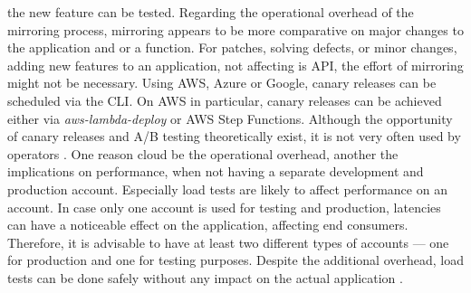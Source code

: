 \documentclass[a4paper,twoside,11pt, pagesize]{scrartcl}
\begin{document}
\begin{spacing}{1.2}
the new feature can be tested. Regarding the operational overhead of the mirroring process, mirroring appears to be more comparative on major changes to the application and or a function. For patches, solving defects, or minor changes, adding new features to an application, not affecting is API, the effort of mirroring might not be necessary. Using AWS, Azure or Google, canary releases can be scheduled via the CLI. On AWS in particular, canary releases can be achieved either via \textit{aws-lambda-deploy} or AWS Step Functions. Although the opportunity of canary releases and A/B testing theoretically exist, it is not very often used by operators \cite{leitner2019mixed}. One reason cloud be the operational overhead, another the implications on performance, when not having a separate development and production account. Especially load tests are likely to affect performance on an account. In case only one account is used for testing and production, latencies can have a noticeable effect on the application, affecting end consumers. Therefore, it is advisable to have at least two different types of accounts — one for production and one for testing purposes. Despite the additional overhead, load tests can be done safely without any impact on the actual application \cite{leitner2019mixed}.

\end{spacing}
\end{document}
